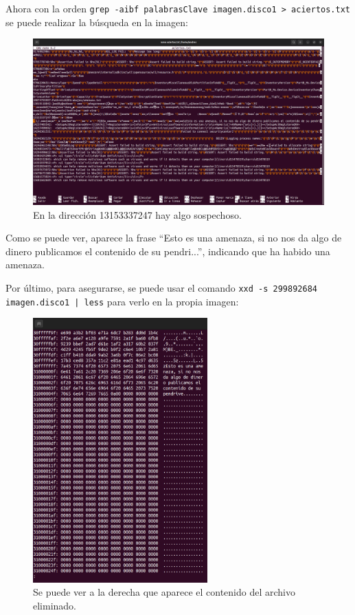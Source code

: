 \documentclass{article}
\begin{document}
Ahora con la orden \verb|grep -aibf palabrasClave imagen.disco1 > aciertos.txt| se puede realizar la búsqueda en la imagen:

\begin{figure}[H]
    \centering
    \includegraphics[width=\textwidth]{imagenes/Captura desde 2022-12-03 21-38-57.png}
    \caption{En la dirección 13153337247 hay algo sospechoso.}
\end{figure}
Como se puede ver, aparece la frase ``Esto es una amenaza, si no nos da algo de dinero publicamos el contenido de su pendri...'', indicando que ha habido una amenaza.

\newpage

Por último, para asegurarse, se puede usar el comando \texttt{xxd -s 299892684 imagen.disco1 | less} para verlo en la propia imagen:

\begin{figure}[H]
    \centering
    \includegraphics[width=0.6\textwidth]{imagenes/Captura desde 2022-12-03 21-39-24.png}
    \caption{Se puede ver a la derecha que aparece el contenido del archivo eliminado.}
\end{figure}
\end{document}
